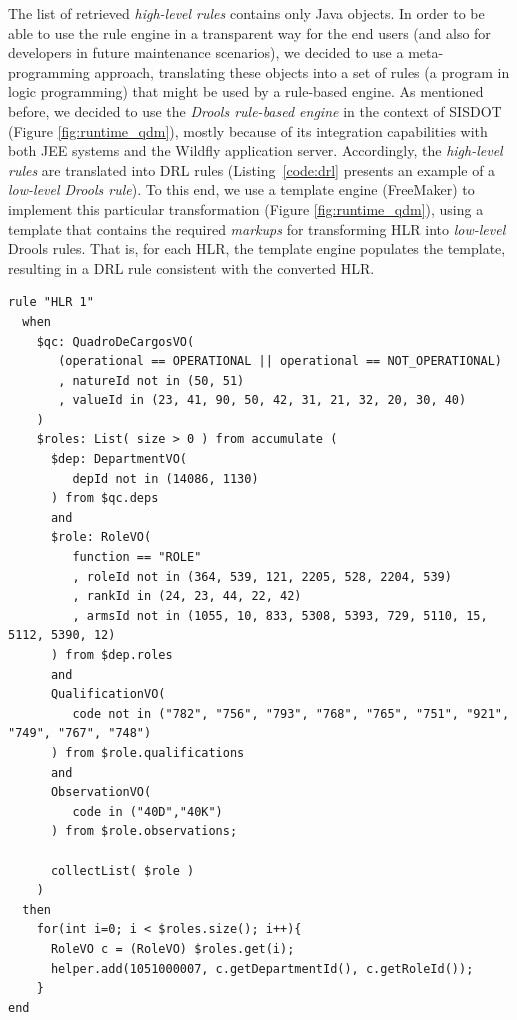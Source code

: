 \documentclass[twocolumn]{bmcart}%
\newcommand{\callers}{\emph{high-level rules}\xspace}
\newcommand{\shc}{HLR\xspace}
\begin{document}
The list of retrieved \callers contains only Java objects. In order to be able to use the rule engine in a transparent way for the end users (and also for developers in future maintenance scenarios), we decided to use a meta-programming approach, translating these objects into a set of rules (a program in logic programming) that might be used by a rule-based engine. As mentioned before, we decided to use the \emph{Drools rule-based engine} in the context of SISDOT (Figure \ref{fig:runtime_qdm}), mostly because of its integration capabilities with both JEE systems and the Wildfly application server. Accordingly, the \callers are translated into DRL rules (Listing~\ref{code:drl} presents an example of a \emph{low-level Drools rule}). To this end, we use a template engine (FreeMaker) to implement this particular transformation (Figure \ref{fig:runtime_qdm}), using a template that contains the required \emph{markups} for transforming \shc into \emph{low-level} Drools rules. That is, for each \shc, the template engine populates the template, resulting in a DRL rule consistent with the converted \shc.

\begin{lstlisting}[frame=single, float=*t, language=DRL, caption=Example of a \emph{low-level Drools rule}, label={code:drl}]
rule "HLR 1"   	
  when
    $qc: QuadroDeCargosVO( 
       (operational == OPERATIONAL || operational == NOT_OPERATIONAL)
       , natureId not in (50, 51)
       , valueId in (23, 41, 90, 50, 42, 31, 21, 32, 20, 30, 40) 
    )	
    $roles: List( size > 0 ) from accumulate ( 
      $dep: DepartmentVO(
         depId not in (14086, 1130)
      ) from $qc.deps 
      and
      $role: RoleVO(
         function == "ROLE"
         , roleId not in (364, 539, 121, 2205, 528, 2204, 539) 
         , rankId in (24, 23, 44, 22, 42) 
         , armsId not in (1055, 10, 833, 5308, 5393, 729, 5110, 15, 5112, 5390, 12) 
      ) from $dep.roles 
      and  		
      QualificationVO(
         code not in ("782", "756", "793", "768", "765", "751", "921", "749", "767", "748")
      ) from $role.qualifications
      and
      ObservationVO(
         code in ("40D","40K")
      ) from $role.observations;
	
      collectList( $role )
    )	 		
  then		 
    for(int i=0; i < $roles.size(); i++){       	
      RoleVO c = (RoleVO) $roles.get(i);
      helper.add(1051000007, c.getDepartmentId(), c.getRoleId());
    }
end
\end{lstlisting}
\end{document}
